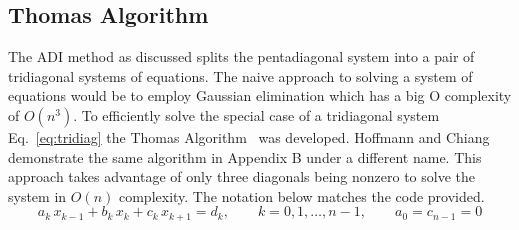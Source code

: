 \documentclass[conf]{new-aiaa}
\begin{document}
\subsection{Thomas Algorithm}
\label{sec:thomas}
The ADI method as discussed splits the pentadiagonal system into a pair of tridiagonal systems of equations. The naive approach to solving a system of 
equations would be to employ Gaussian elimination which has a big O complexity of $O(n^3)$. To efficiently 
solve the special case of a tridiagonal system Eq.~\eqref{eq:tridiag} the Thomas Algorithm~\cite{thomas1949} was developed. 
Hoffmann and Chiang~\cite{hoffmann2000} demonstrate the same algorithm in Appendix B under a different name.
This approach takes advantage of only three diagonals being nonzero to solve the system in $O(n)$ complexity.
The notation below matches the code provided. 
\begin{equation}
  a_k\,x_{k-1} + b_k\,x_k + c_k\,x_{k+1} = d_k,
  \qquad k = 0, 1, \dots, n-1,
  \qquad a_0 = c_{n-1} = 0
  \label{eq:tridiag}
\end{equation}
\end{document}
